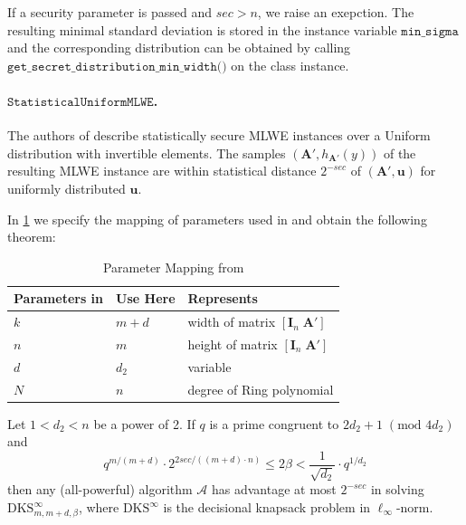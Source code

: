 \documentclass[
  a4paper,  %
  twoside,  %
  bibliography=totoc,
  headsepline,
  cleardoublepage=empty,
  parskip=half,
  draft=false
]{scrbook}
\begin{document}
If a security parameter is passed and $sec > n$, we raise an exepction.
The resulting minimal standard deviation is stored in the instance variable $\texttt{min\_sigma}$ and the corresponding distribution can be obtained by calling $\texttt{get\_secret\_distribution\_min\_width()}$ on the class instance.



\paragraph{$\texttt{StatisticalUniformMLWE}$.} The authors of \cite{BDLOP18} describe statistically secure MLWE instances over a Uniform distribution with invertible elements. The samples $(\mathbf{A}', h_{\mathbf{A}'}(y))$ of the resulting MLWE instance are within statistical distance $2^{-sec}$ of $(\mathbf{A}', \mathbf{u})$ for uniformly distributed $\mathbf{u}$. %

In \cref{tab:mapping-BDLOP18} we specify the mapping of parameters used in \cite{BDLOP18} and obtain the following theorem: %

\begin{table}
  \centering
  \begin{tabular}[h]{lll}
    \toprule
    Parameters in \cite{BDLOP18} & Use Here & Represents                                         \\\hline
    $k$                          & $m+d$    & width of matrix $[ \mathbf{I}_n \; \mathbf{A}' ]$  \\
    $n$                          & $m$      & height of matrix $[ \mathbf{I}_n \; \mathbf{A}' ]$ \\
    $d$                          & $d_2$    & variable                                           \\
    $N$                          & $n$      & degree of Ring polynomial                          \\
    \bottomrule
  \end{tabular}
  \caption{Parameter Mapping from \cite{BDLOP18}}\label{tab:mapping-BDLOP18}
\end{table}


\begin{theorem}
  Let $1 < d_2 < n$ be a power of 2. If $q$ is a prime congruent to $2d_2 + 1 \;(\text{mod } 4d_2)$ and
  \begin{equation}
    q^{m/(m+d)} \cdot 2^{2 sec/((m+d)\cdot n)} \leq 2 \beta < \frac{1}{\sqrt{d_2}} \cdot q^{1/d_2}
  \end{equation}
  then any (all-powerful) algorithm $\mathcal{A}$ has advantage at most $2^{-sec}$ in solving $\text{DKS}_{m,m+d,\beta}^\infty$, where $\text{DKS}^\infty$ is the decisional knapsack problem in $\ell_\infty$-norm.
\end{theorem}
\end{document}
